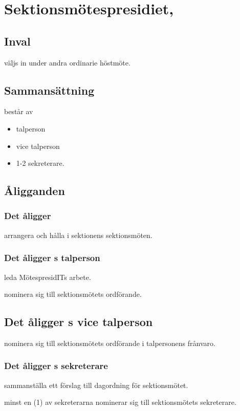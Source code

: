 \section{Sektionsmötespresidiet, \MOTESPRESIDIT}

\subsection{Inval}
\MOTESPRESIDIT väljs in under andra ordinarie höstmöte.

\subsection{Sammansättning}
\MOTESPRESIDIT består av
\begin{itemize}
        \item talperson
        \item vice talperson
        \item 1-2 sekreterare.
\end{itemize}

\subsection{Åligganden}

\subsubsection{Det åligger \MOTESPRESIDIT}
\begin{att}
	\item arrangera och hålla i sektionens sektionsmöten.
\end{att}

\subsubsection{Det åligger \MOTESPRESIDIT{}s talperson}
\begin{att}
	\item leda MötespresidITs arbete.
    \item nominera sig till sektionsmötets ordförande.
\end{att}

\subsection{Det åligger \MOTESPRESIDIT{}s vice talperson}
\begin{att}
	\item nominera sig till sektionsmötets ordförande i talpersonens frånvaro.
\end{att}

\subsubsection{Det åligger \MOTESPRESIDIT{}s sekreterare}
\begin{att}
	\item sammanställa ett förslag till dagordning för sektionsmötet.
    \item minst en (1) av sekreterarna nominerar sig till sektionsmötets sekreterare.
\end{att}